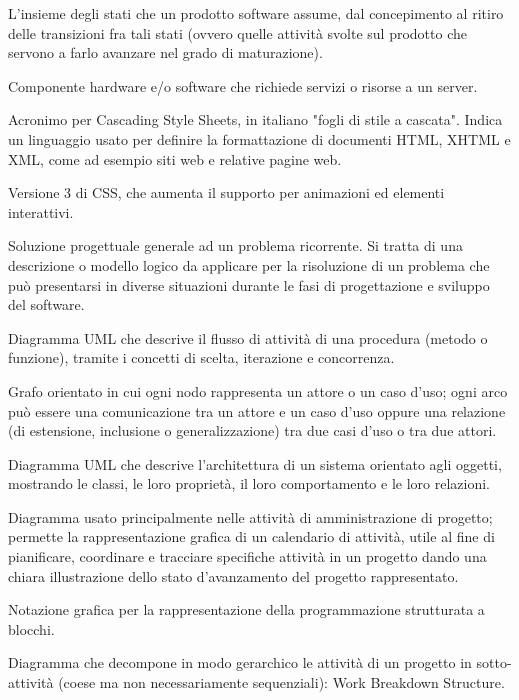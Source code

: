 \item[ciclo di vita (di un prodotto)] L'insieme degli stati che un prodotto software assume, dal concepimento al ritiro delle transizioni fra tali stati (ovvero quelle attività svolte sul prodotto che servono a farlo avanzare nel grado di maturazione).
\item[client] Componente hardware e/o software che richiede servizi o risorse a un server.
\item[CSS] Acronimo per Cascading Style Sheets, in italiano "fogli di stile a cascata". Indica un linguaggio usato per definire la formattazione di documenti HTML, XHTML e XML, come ad esempio siti web e relative pagine web.
\item[CSS3] Versione 3 di CSS, che aumenta il supporto per animazioni ed elementi interattivi.
\item[design pattern] Soluzione progettuale generale ad un problema ricorrente. Si tratta di una descrizione o modello logico da applicare per la risoluzione di un problema che può presentarsi in diverse situazioni durante le fasi di progettazione e sviluppo del software.
\item[diagramma delle attività] Diagramma UML che descrive il flusso di attività di una procedura (metodo o funzione), tramite i concetti di scelta, iterazione e concorrenza.
\item[diagramma dei casi d'uso] Grafo orientato in cui ogni nodo rappresenta un attore o un caso d'uso; ogni arco può essere una comunicazione tra un attore e un caso d'uso oppure una relazione (di estensione, inclusione o generalizzazione) tra due casi d'uso o tra due attori.
\item[diagramma delle classi] Diagramma UML che descrive l'architettura di un sistema orientato agli oggetti, mostrando le classi, le loro proprietà, il loro comportamento e le loro relazioni.
\item[diagramma di Gantt] Diagramma usato principalmente nelle attività di amministrazione di progetto; permette la rappresentazione grafica di un calendario di attività, utile al fine di pianificare, coordinare e tracciare specifiche attività in un progetto dando una chiara illustrazione dello stato d’avanzamento del progetto rappresentato.
\item[diagramma Nassi–Shneiderman] Notazione grafica per la rappresentazione della programmazione strutturata a blocchi. 
\item[diagramma WBS] Diagramma che decompone in modo gerarchico le attività di un progetto in sotto-attività (coese ma non necessariamente sequenziali): Work Breakdown Structure.

